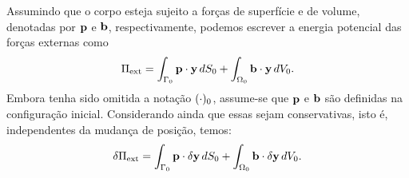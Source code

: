 \documentclass[Tese.tex]{subfiles}
\begin{document}
Assumindo que o corpo esteja sujeito a forças de superfície e de volume, denotadas por $\mathbf{p}$ e $\mathbf{b}$, respectivamente, podemos escrever a energia potencial das forças externas como
\begin{equation}\label{eq:piext}
\Pi_\text{ext} = \int_{\Gamma_0}\mathbf{p}\cdot \mathbf{y}\,dS_0 + \int_{\Omega_0}\mathbf{b}\cdot \mathbf{y}\,dV_0.
\end{equation}
Embora tenha sido omitida a notação $(\cdot)_0$, assume-se que $\mathbf{p}$ e $\mathbf{b}$ são definidas na configuração inicial. Considerando ainda que essas sejam conservativas, isto é, independentes da mudança de posição, temos:
\begin{equation}\label{eq:dpiext}
\delta\Pi_\text{ext} = \int_{\Gamma_0}\mathbf{p}\cdot \delta\mathbf{y}\,dS_0 + \int_{\Omega_0}\mathbf{b}\cdot \delta\mathbf{y}\,dV_0.
\end{equation}
\end{document}
